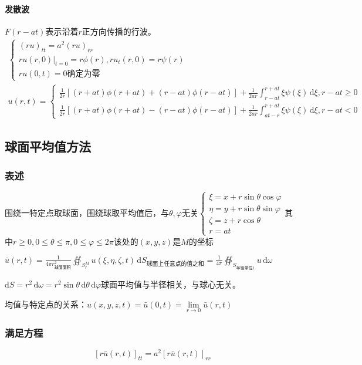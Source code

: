 \paragraph{发散波}\(F(r-at)\)表示沿着\(r\)正方向传播的行波。
\begin{gather*}
    \begin{cases}
(ru)_{tt}=a^2(ru)_{rr}\\
ru(r,0)|_{t=0}=r\phi(r),ru_t(r,0)=r\psi(r)\\
ru(0,t)=0\text{确定为零}
\end{cases}\\
u(r,t)=\begin{cases}\frac{1}{2r}\left[(r+at)\phi(r+at)+(r-at)\phi(r-at)\right]+\frac{1}{2ar}\int_{r-at}^{r+at}\xi\psi(\xi)\,\mathrm{d}\xi,r-at\geq0\\\frac{1}{2r}\left[(r+at)\phi(r+at)-(r-at)\phi(r-at)\right]+\frac{1}{2ar}\int_{at-r}^{r+at}\xi\psi(\xi)\,\mathrm{d}\xi,r-at<0\end{cases}
\end{gather*}


\subsection{球面平均值方法}

\subsubsection{表述}

围绕一特定点取球面，围绕球取平均值后，与\(\theta,\varphi\)无关\(\begin{cases}\xi=x+r\sin{\theta}\cos{\varphi}\\\eta=y+r\sin{\theta}\sin{\varphi}\\\zeta=z+r\cos{\theta}\\r=at\end{cases}\)其中\(r\geq0,0\le\theta\le\pi,0\le\varphi\le2\pi\)该处的\((x,y,z)\)是\(M\)的坐标

\(\bar{u}(r,t)=\frac{1}{4\pi r^2_\text{球面面积}}\oiint_{S_r^M}u(\xi,\eta,\zeta,t)\,\mathrm{d}S_\text{球面上任意点的值之和}=\frac{1}{4\pi}\oiint_{S_\text{半径单位1}}u\,\mathrm{d}\omega\)

\(\mathrm{d}S=r^2\,\mathrm{d}\omega=r^2\sin{\theta}\,\mathrm{d}\theta\,\mathrm{d}\varphi\)球面平均值与半径相关，与球心无关。

均值与特定点的关系：\(u(x,y,z,t)=\bar{u}(0,t)=\lim\limits_{r\rightarrow0}{\bar{u}(r,t)}\)

\subsubsection{满足方程}
\[
[r\bar{u}(r,t)]_{tt}=a^2[r\bar{u}(r,t)]_{rr}
\]

